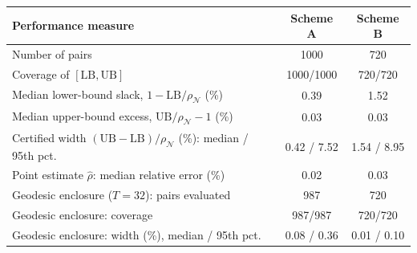 \begin{tabular}{lcc}
\toprule
Performance measure & Scheme A & Scheme B\\
\midrule
Number of pairs & 1000 & 720\\
Coverage of $[\mathrm{LB},\mathrm{UB}]$ & 1000/1000 & 720/720\\
Median lower-bound slack, $1-\mathrm{LB}/\rho_\mathcal{N}$ (\%) & 0.39 & 1.52\\
Median upper-bound excess, $\mathrm{UB}/\rho_\mathcal{N}-1$ (\%) & 0.03 & 0.03\\
Certified width $(\mathrm{UB}-\mathrm{LB})/\rho_\mathcal{N}$ (\%): median / 95th pct. & 0.42 / 7.52 & 1.54 / 8.95\\
Point estimate $\hat\rho$: median relative error (\%) & 0.02 & 0.03\\
\midrule
Geodesic enclosure ($T=32$): pairs evaluated & 987 & 720\\
Geodesic enclosure: coverage & 987/987 & 720/720\\
Geodesic enclosure: width (\%), median / 95th pct. & 0.08 / 0.36 & 0.01 / 0.10\\
\bottomrule
\end{tabular}